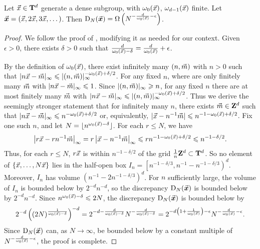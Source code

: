 \begin{theorem}\label{thm:disc-lower-bound}
Let $\vec{x}\in \mathbf{T}^d$ generate a dense subgroup, with $\omega_0(\vec{x})$, 
$\omega_{d-1}(\vec{x})$ finite. Let $\vec{\boldsymbol x}=(\vec{x},2\vec{x},3\vec{x},\dots)$. Then 
$\operatorname{D}_N(\vec{\boldsymbol x}) = \Omega\left(N^{-\frac{d}{\omega_0(\vec{x})}-\epsilon} \right)$. 
\end{theorem}
\begin{proof}
We follow the proof of \cite[Ch.~2, Th.~3.3]{kuipers-niederreiter-1974}, 
modifying it as needed for our context. Given $\epsilon>0$, there exists 
$\delta>0$ such that 
$\frac{d}{\omega_0(\vec{x})-\delta} = \frac{d}{\omega_0(\vec{x})} + \epsilon$. 

By the definition of $\omega_0(\vec{x})$, there exist infinitely many 
$(n,\vec{m})$ with $n>0$ such that 
$|n \vec{x} - \vec{m}|_\infty \leqslant |(n,\vec{m})|_\infty^{-\omega_0(\vec{x})+\delta/2}$. 
For any fixed $n$, where are only finitely many $\vec{m}$ with 
$|n \vec{x} - \vec{m}|_\infty \leqslant 1$. Since $|(n,\vec{m})|_\infty \geqslant n$, for 
any fixed $n$ there are at most finitely many $\vec{m}$ with 
$|n \vec{x} - \vec{m}|_\infty \leqslant |(n,\vec{m})|_\infty^{-\omega_0(\vec{x})+\delta/2}$. 
Thus we derive the seemingly stronger statement that for infinitely many $n$, 
there exists $\vec{m}\in \mathbf{Z}^d$ such that 
$|n \vec{x}-\vec{m}|_\infty \leqslant n^{-\omega_0(\vec{x})+\delta/2}$ or, equivalently, 
$|\vec{x}-n^{-1}\vec{m}| \leqslant n^{-1-\omega_0(\vec{x})+\delta/2}$. Fix one such $n$, 
and let $N=\lfloor n^{\omega_0(\vec{x})-\delta}\rfloor$. For each $r\leqslant N$, 
we have 
\[
	\left|r \vec{x} - r n^{-1} \vec{m}\right|_\infty 
		= r \left|\vec{x} - n^{-1} \vec{m}\right|_\infty
		\leqslant r n^{-1-\omega_0(\vec{x})+\delta/2}
		\leqslant n^{-1-\delta/2}. 
\]
Thus, for each $r\leqslant N$, $r \vec{x}$ is within $n^{-1-\delta/2}$ of the 
grid $\frac 1 n \mathbf{Z}^d\subset \mathbf{T}^d$. So no element of 
$\{\vec{x},\dots,N \vec{x}\}$ lies in the half-open box 
$I_n = \left[ n^{-1 - \delta / 3}, n^{-1} - n^{-1 - \delta / 3}\right)^d$. 
Moreover, $I_n$ has volume $\left(n^{-1} - 2n^{-1 - \delta / 3}\right)^d$. 
For $n$ sufficiently large, the volume of $I_n$ is bounded below by 
$2^{-d} n^{-d}$, so the discrepancy $\operatorname{D}_N(\vec{\boldsymbol x})$ is 
bounded below by $2^{-d} n^{-d}$. Since $n^{\omega_0(\vec{x})-\delta} \leqslant 2 N$, 
the discrepancy $\operatorname{D}_N(\vec{\boldsymbol x})$ is bounded below by 
\[
	2^{-d} \left( (2 N)^{\frac{1}{\omega_0(\vec{x})-\delta}}\right)^{-d} 
		= 2^{-d-\frac{d}{\omega_0(\vec{x})-\delta}} N^{-\frac{d}{\omega_0(\vec{x})-\delta}}
		= 2^{-d\left(1+\frac{1}{\omega_0(\vec{x})}\right)-\epsilon} N^{-\frac{d}{\omega_0(\vec{x})}-\epsilon} .
\]
Since $\operatorname{D}_N(\vec{\boldsymbol x})$ can, as $N\to \infty$, be bounded below by a constant 
multiple of $N^{-\frac{d}{\omega_0(\vec{x})}-\epsilon}$, the proof is complete.
\end{proof}






